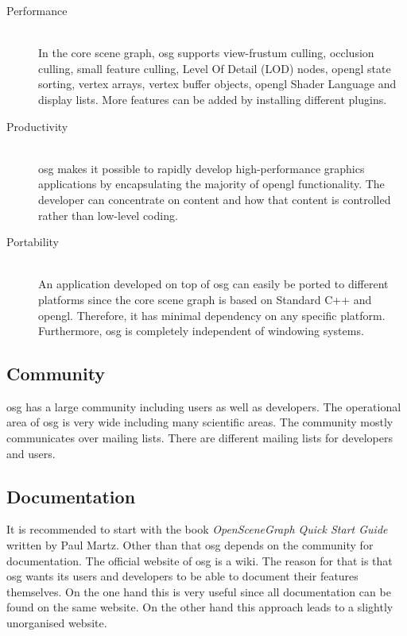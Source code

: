 \begin{description}
	\item[Performance] \hfill\\ In the core scene graph, \gls{osg} supports view-frustum culling, occlusion culling, small feature culling, Level Of Detail (LOD) nodes, \gls{opengl} state sorting, vertex arrays, vertex buffer objects, \gls{opengl} Shader Language and display lists. More features can be added by installing different plugins.
	\item[Productivity] \hfill\\ \gls{osg} makes it possible to rapidly develop high-performance graphics applications by encapsulating the majority of \gls{opengl} functionality. The developer can concentrate on content and how that content is controlled rather than low-level coding.
	\item[Portability] \hfill\\ An application developed on top of \gls{osg} can easily be ported to different platforms since the core scene graph is based on Standard C++ and \gls{opengl}. Therefore, it has minimal dependency on any specific platform. Furthermore, \gls{osg} is completely independent of windowing systems.
\end{description}

\subsection{Community}
\gls{osg} has a large community including users as well as developers. The operational area of \gls{osg} is very wide including many scientific areas. The community mostly communicates over mailing lists. There are different mailing lists for developers and users.

\subsection{Documentation}
It is recommended to start with the book \emph{OpenSceneGraph Quick Start Guide}\cite{osgGuide} written by Paul Martz.
Other than that \gls{osg} depends on the community for documentation. The official website of \gls{osg} is a wiki. The reason for that is that \gls{osg} wants its users and developers to be able to document their features themselves. On the one hand this is very useful since all documentation can be found on the same website. On the other hand this approach leads to a slightly unorganised website.

